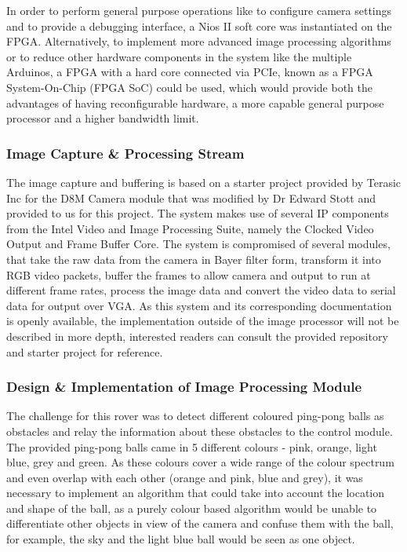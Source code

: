 \documentclass[a4paper]{article}
\begin{document}
In order to perform general purpose operations like
    to configure camera settings
    and to provide a debugging interface,
a Nios II soft core was instantiated on the FPGA. 
Alternatively, to implement more advanced image processing algorithms
or to reduce other hardware components in the system like the multiple Arduinos, 
a FPGA with a hard core connected via PCIe, 
known as a FPGA System-On-Chip (FPGA SoC) \cite{FPGASoC} could be used, 
which would provide both the advantages of having reconfigurable hardware,
a more capable general purpose processor and a higher bandwidth limit. 

\subsubsection{Image Capture \& Processing Stream}

The image capture and buffering is based on a starter project provided
by Terasic Inc for the D8M Camera module that was modified by Dr Edward Stott 
\cite{EEE2Rover} and provided to us for this project. The system makes use of 
several IP components from the Intel Video and Image Processing Suite,
namely the Clocked Video Output and Frame Buffer Core. The system is compromised
of several modules, that take the raw data from the camera in Bayer filter form\cite{TerasicD8MWeb},
transform it into RGB video packets, buffer the frames to allow camera and output
to run at different frame rates, process the image data and convert the video 
data to serial data for output over VGA.\cite{EEE2Rover} As this system and its 
corresponding documentation is openly available, the implementation outside of 
the image processor will not be described in more depth, interested readers can 
consult the provided repository and starter project for reference. 

\subsubsection{Design \& Implementation of Image Processing Module}

The challenge for this rover was to detect different coloured ping-pong balls as
obstacles and relay the information about these obstacles to the control module. 
The provided ping-pong balls came in 5 different colours - pink, orange, light 
blue, grey and green. As these colours cover a wide range of the colour spectrum
and even overlap with each other (orange and pink, blue and grey), it was 
necessary to implement an algorithm that could take into account the location 
and shape of the ball, as a purely colour based algorithm would be unable to 
differentiate other objects in view of the camera and confuse them with the ball, 
for example, the sky and the light blue ball would be seen as one object. 
 
\end{document}
